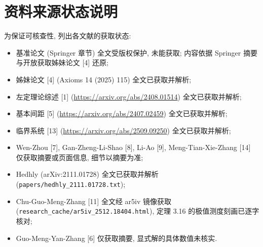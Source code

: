 \documentclass[UTF8]{ctexart}
\begin{document}
\section{资料来源状态说明}

为保证可核查性, 列出各文献的获取状态:

\begin{itemize}
	\item 基准论文 (Springer 章节) 全文受版权保护, 未能获取; 内容依据 Springer
		摘要与开放获取姊妹论文 [4] 还原;
	\item 姊妹论文 [4] (Axioms 14 (2025) 115) 全文已获取并解析;
\item 左定理论综述 [1] (\url{https://arxiv.org/abs/2408.01514}) 全文已获取并解析;
\item 基本间距 [5] (\url{https://arxiv.org/abs/2407.02459}) 全文已获取并解析;
\item 临界系统 [13] (\url{https://arxiv.org/abs/2509.09250}) 全文已获取并解析;
	\item Wen-Zhou [7], Gan-Zheng-Li-Shao [8], Li-Ao [9], Meng-Tian-Xie-Zhang [14] 仅获取摘要或页面信息, 细节以摘要为准;
	\item Hedhly (arXiv:2111.01728) 全文已获取并解析 (\texttt{papers/hedhly\_2111.01728.txt});
	\item Chu-Guo-Meng-Zhang [11] 全文经 ar5iv 镜像获取 (\texttt{research\_cache/ar5iv\_2512.18404.html}), 定理 3.16 的极值测度刻画已逐字核对;
	\item Guo-Meng-Yan-Zhang [6] 仅获取摘要, 显式解的具体数值未核实.
\end{itemize}
\end{document}
